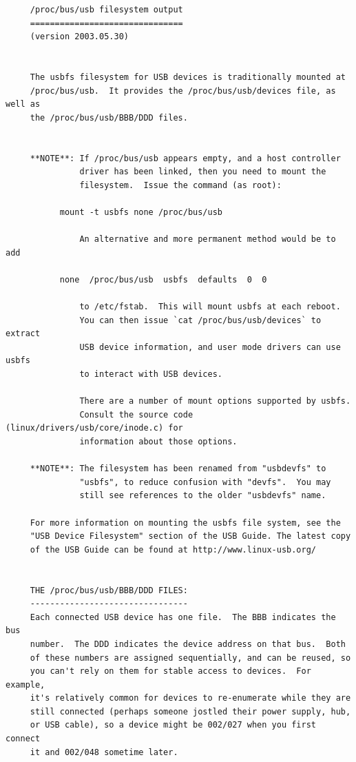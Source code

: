 {{{{{{{{{{{{{{{{{\begin{verbatim}
     /proc/bus/usb filesystem output
     ===============================
     (version 2003.05.30)
     
     
     The usbfs filesystem for USB devices is traditionally mounted at
     /proc/bus/usb.  It provides the /proc/bus/usb/devices file, as well as
     the /proc/bus/usb/BBB/DDD files.
     
     
     **NOTE**: If /proc/bus/usb appears empty, and a host controller
               driver has been linked, then you need to mount the
               filesystem.  Issue the command (as root):
     
           mount -t usbfs none /proc/bus/usb
     
               An alternative and more permanent method would be to add
     
           none  /proc/bus/usb  usbfs  defaults  0  0
     
               to /etc/fstab.  This will mount usbfs at each reboot.
               You can then issue `cat /proc/bus/usb/devices` to extract
               USB device information, and user mode drivers can use usbfs
               to interact with USB devices.
     
               There are a number of mount options supported by usbfs.
               Consult the source code (linux/drivers/usb/core/inode.c) for
               information about those options.
     
     **NOTE**: The filesystem has been renamed from "usbdevfs" to
               "usbfs", to reduce confusion with "devfs".  You may
               still see references to the older "usbdevfs" name.
     
     For more information on mounting the usbfs file system, see the
     "USB Device Filesystem" section of the USB Guide. The latest copy
     of the USB Guide can be found at http://www.linux-usb.org/
     
     
     THE /proc/bus/usb/BBB/DDD FILES:
     --------------------------------
     Each connected USB device has one file.  The BBB indicates the bus
     number.  The DDD indicates the device address on that bus.  Both
     of these numbers are assigned sequentially, and can be reused, so
     you can't rely on them for stable access to devices.  For example,
     it's relatively common for devices to re-enumerate while they are
     still connected (perhaps someone jostled their power supply, hub,
     or USB cable), so a device might be 002/027 when you first connect
     it and 002/048 sometime later.
     

\end{verbatim}}}}}}}}}}}}}}}}}}
